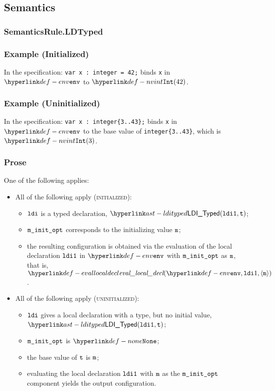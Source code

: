 \subsection{Semantics}
\subsubsection{SemanticsRule.LDTyped\label{sec:SemanticsRule.LDTyped}}
\subsubsection{Example (Initialized)}
In the specification:
\texttt{var x : integer = 42;} binds \texttt{x} in $\env$ to $\nvint(42)$.

\subsubsection{Example (Uninitialized)}
In the specification:
\verb|var x : integer{3..43};| binds \texttt{x} in $\env$ to the base value of \verb|integer{3..43}|,
which is $\nvint(3)$.

\subsubsection{Prose}
One of the following applies:
\begin{itemize}
    \item All of the following apply (\textsc{initialized}):
    \begin{itemize}
        \item $\texttt{ldi}$ is a typed declaration, $\LDITyped(\ldione, \vt)$;
        \item $\texttt{m\_init\_opt}$ corresponds to the initializing value $\texttt{m}$;
        \item the resulting configuration is obtained via the evaluation
        of the local declaration $\texttt{ldi1}$ in $\env$ with $\texttt{m\_init\_opt}$ as $\texttt{m}$,
        that is, \\ $\evallocaldecl{\env, \ldi1, \langle \vm\rangle}$.
    \end{itemize}

    \item All of the following apply (\textsc{uninitialized}):
    \begin{itemize}
      \item $\texttt{ldi}$ gives a local declaration with a type, but no initial value, \\
            $\LDITyped(\ldione, \vt)$;
      \item $\texttt{m\_init\_opt}$ is $\None$;
      \item the base value of $\texttt{t}$ is $\texttt{m}$\ProseOrError;
      \item evaluating the local declaration $\texttt{ldi1}$ with $\texttt{m}$
            as the $\texttt{m\_init\_opt}$ component yields the output configuration.
    \end{itemize}
\end{itemize}
